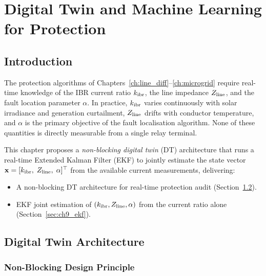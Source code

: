 \chapter{Digital Twin and Machine Learning for Protection}
\label{ch:monitoring_ml}
\label{ch:digital_twin}
\label{ch:ml}

\section{Introduction}
\label{sec:ch9_intro}

The protection algorithms of Chapters~\ref{ch:line_diff}--\ref{ch:microgrid}
require real-time knowledge of the IBR current ratio $k_\mathrm{ibr}$, the line
impedance $Z_\mathrm{line}$, and the fault location parameter $\alpha$.
In practice, $k_\mathrm{ibr}$ varies continuously with solar irradiance and
generation curtailment, $Z_\mathrm{line}$ drifts with conductor temperature,
and $\alpha$ is the primary objective of the fault localisation algorithm.
None of these quantities is directly measurable from a single relay terminal.

This chapter proposes a \emph{non-blocking digital twin} (DT) architecture
that runs a real-time Extended Kalman Filter (EKF) to jointly estimate
the state vector $\mathbf{x} = [k_\mathrm{ibr},\; Z_\mathrm{line},\; \alpha]^\top$ from
the available current measurements, delivering:
\begin{itemize}
\item A non-blocking DT architecture for real-time
      protection audit (Section~\ref{sec:ch9_architecture}).
\item EKF joint estimation of $(k_\mathrm{ibr}, Z_\mathrm{line}, \alpha)$
      from the current ratio alone (Section~\ref{sec:ch9_ekf}).
\end{itemize}

\section{Digital Twin Architecture}
\label{sec:ch9_architecture}

\subsection{Non-Blocking Design Principle}

